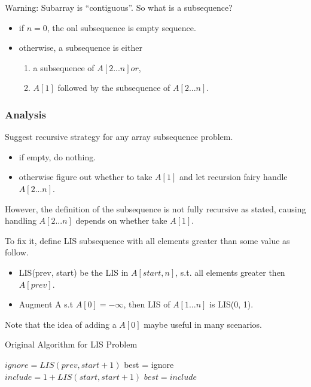 Warning: Subarray is ``contiguous''. So what is a subsequence?
\begin{itemize}
    \item if $n=0$, the onl subsequence is empty sequence.
    \item otherwise, a subsequence is either
    \begin{enumerate}
        \item a subsequence of $A[2...n] or$,
        \item $A[1]$ followed by the subsequence of $A[2...n]$.
    \end{enumerate}
\end{itemize}

\subsubsection{Analysis}
Suggest recursive strategy for any array subsequence problem.
\begin{itemize}
    \item if empty, do nothing.
    \item otherwise figure out whether to take $A[1]$ and let recursion fairy handle $A[2...n]$.
\end{itemize}

However, the definition of the subsequence is not fully recursive as stated, causing handling $A[2...n]$ depends on whether take $A[1]$.

To fix it, define LIS subsequence with all elements greater than some value as follow.

\begin{itemize}
    \item LIS(prev, start) be the LIS in $A[start, n]$, s.t. all elements greater then $A[prev]$.
    \item Augment A s.t $A[0] = -\infty$, then LIS of $A[1...n]$ is LIS(0, 1).
\end{itemize}

Note that the idea of adding a $A[0]$ maybe useful in many scenarios.

\begin{algorithm}[H]
\caption{Original Algorithm for LIS Problem}\label{ori_lis_alg}
\begin{algorithmic}[1]
 
\EndIf
\State $ignore = LIS(prev, start +1)$
\State best = ignore
    \State $include = 1 + LIS(start, start+1)$
        \State $best = include$
    \EndIf
\EndIf
{}
\EndProcedure
\end{algorithmic}
\end{algorithm}


